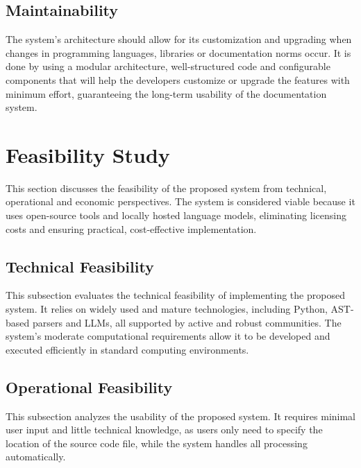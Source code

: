 \subsection{Maintainability}
\hspace{0.5cm}The system’s architecture should allow for its customization and upgrading when changes in programming languages, libraries or documentation norms occur. It is done by using a modular architecture, well-structured code and configurable components that will help the developers customize or upgrade the features with minimum effort, guaranteeing the long-term usability of the documentation system. 

\section{Feasibility Study}
\hspace{0.5cm}
This section discusses the feasibility of the proposed system from technical, operational and economic perspectives. The system is considered viable because it uses open-source tools and locally hosted language models, eliminating licensing costs and ensuring practical, cost-effective implementation.

\subsection{Technical Feasibility}
\hspace{0.5cm}
This subsection evaluates the technical feasibility of implementing the proposed system. It relies on widely used and mature technologies, including Python, AST-based parsers and LLMs, all supported by active and robust communities. The system’s moderate computational requirements allow it to be developed and executed efficiently in standard computing environments.
\subsection{Operational Feasibility}
\hspace{0.5cm}
This subsection analyzes the usability of the proposed system. It requires minimal user input and little technical knowledge, as users only need to specify the location of the source code file, while the system handles all processing automatically.

